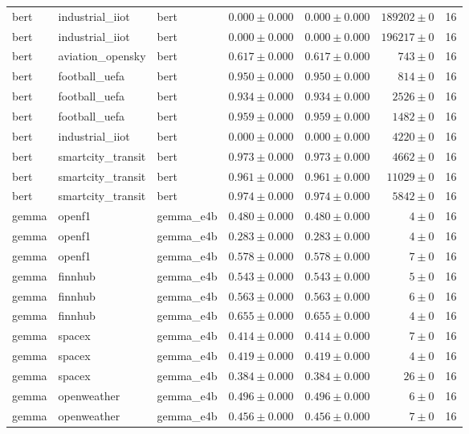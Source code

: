 \begin{table}[htbp]
\begin{tabular}{l l l r r r r}
bert & industrial\_iiot & bert & $0.000\pm0.000$ & $0.000\pm0.000$ & $189202\pm0$ & 16 \\
bert & industrial\_iiot & bert & $0.000\pm0.000$ & $0.000\pm0.000$ & $196217\pm0$ & 16 \\
bert & aviation\_opensky & bert & $0.617\pm0.000$ & $0.617\pm0.000$ & $743\pm0$ & 16 \\
bert & football\_uefa & bert & $0.950\pm0.000$ & $0.950\pm0.000$ & $814\pm0$ & 16 \\
bert & football\_uefa & bert & $0.934\pm0.000$ & $0.934\pm0.000$ & $2526\pm0$ & 16 \\
bert & football\_uefa & bert & $0.959\pm0.000$ & $0.959\pm0.000$ & $1482\pm0$ & 16 \\
bert & industrial\_iiot & bert & $0.000\pm0.000$ & $0.000\pm0.000$ & $4220\pm0$ & 16 \\
bert & smartcity\_transit & bert & $0.973\pm0.000$ & $0.973\pm0.000$ & $4662\pm0$ & 16 \\
bert & smartcity\_transit & bert & $0.961\pm0.000$ & $0.961\pm0.000$ & $11029\pm0$ & 16 \\
bert & smartcity\_transit & bert & $0.974\pm0.000$ & $0.974\pm0.000$ & $5842\pm0$ & 16 \\
gemma & openf1 & gemma\_e4b & $0.480\pm0.000$ & $0.480\pm0.000$ & $4\pm0$ & 16 \\
gemma & openf1 & gemma\_e4b & $0.283\pm0.000$ & $0.283\pm0.000$ & $4\pm0$ & 16 \\
gemma & openf1 & gemma\_e4b & $0.578\pm0.000$ & $0.578\pm0.000$ & $7\pm0$ & 16 \\
gemma & finnhub & gemma\_e4b & $0.543\pm0.000$ & $0.543\pm0.000$ & $5\pm0$ & 16 \\
gemma & finnhub & gemma\_e4b & $0.563\pm0.000$ & $0.563\pm0.000$ & $6\pm0$ & 16 \\
gemma & finnhub & gemma\_e4b & $0.655\pm0.000$ & $0.655\pm0.000$ & $4\pm0$ & 16 \\
gemma & spacex & gemma\_e4b & $0.414\pm0.000$ & $0.414\pm0.000$ & $7\pm0$ & 16 \\
gemma & spacex & gemma\_e4b & $0.419\pm0.000$ & $0.419\pm0.000$ & $4\pm0$ & 16 \\
gemma & spacex & gemma\_e4b & $0.384\pm0.000$ & $0.384\pm0.000$ & $26\pm0$ & 16 \\
gemma & openweather & gemma\_e4b & $0.496\pm0.000$ & $0.496\pm0.000$ & $6\pm0$ & 16 \\
gemma & openweather & gemma\_e4b & $0.456\pm0.000$ & $0.456\pm0.000$ & $7\pm0$ & 16 \\

\end{tabular}
\end{table}
